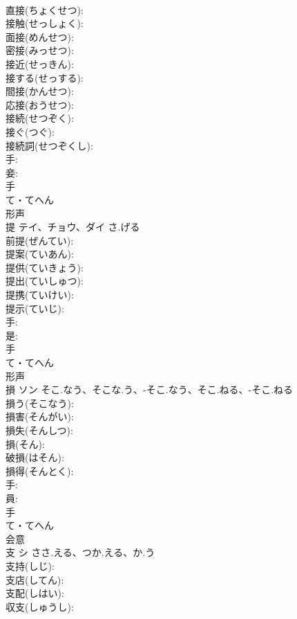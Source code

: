 \documentclass[8pt]{extreport}
\begin{document}
\begin{CJK}{UTF8}{min}
\\	直接(ちょくせつ): 
\\	接触(せっしょく): 
\\	面接(めんせつ): 
\\	密接(みっせつ): 
\\	接近(せっきん): 
\\	接する(せっする): 
\\	間接(かんせつ): 
\\	応接(おうせつ): 
\\	接続(せつぞく): 
\\	接ぐ(つぐ): 
\\	接続詞(せつぞくし): 
\\	手: 
\\	妾: 
\\	手	
\\	て・てへん	
\\	形声 
\\	提	テイ、チョウ、ダイ	さ.げる		
\\	前提(ぜんてい): 
\\	提案(ていあん): 
\\	提供(ていきょう): 
\\	提出(ていしゅつ): 
\\	提携(ていけい): 
\\	提示(ていじ): 
\\	手: 
\\	是: 
\\	手	
\\	て・てへん	
\\	形声 
\\	損	ソン	そこ.なう、そこな.う、-そこ.なう、そこ.ねる、-そこ.ねる		
\\	損う(そこなう): 
\\	損害(そんがい): 
\\	損失(そんしつ): 
\\	損(そん): 
\\	破損(はそん): 
\\	損得(そんとく): 
\\	手: 
\\	員: 
\\	手	
\\	て・てへん	
\\	会意 
\\	支	シ	ささ.える、つか.える、か.う		
\\	支持(しじ): 
\\	支店(してん): 
\\	支配(しはい): 
\\	収支(しゅうし): 

\end{CJK}
\end{document}

